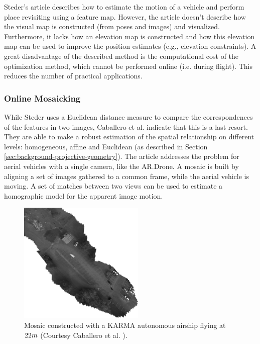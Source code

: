 Steder's article describes how to estimate the motion of a vehicle and perform place revisiting using a feature map.
However, the article doesn't describe how the visual map is constructed (from poses and images) and visualized.
Furthermore, it lacks how an elevation map is constructed and how this elevation map can be used to improve the position estimates (e.g., elevation constraints).
A great disadvantage of the described method is the computational cost of the optimization method, which cannot be performed online (i.e. during flight). This reduces the number of practical applications.


\subsubsection{Online Mosaicking}
\label{related-online-mosaicking}
While Steder uses a Euclidean distance measure to compare the correspondences of the features in two images, Caballero et al. \cite{caballero2009unmanned} indicate that this is a last resort.
They are able to make a robust estimation of the spatial relationship on different levels: homogeneous, affine and Euclidean (as described in Section \ref{sec:background-projective-geometry}).
The article addresses the problem for aerial vehicles with a single camera, like the AR.Drone.
A mosaic is built by aligning a set of images gathered to a common frame, while the aerial vehicle is moving.
A set of matches between two views can be used to estimate a homographic model for the apparent image motion.

\begin{figure}[htb]
\centering
\includegraphics[width=6cm]{images/Caballero_map.png}
\caption{Mosaic constructed with a KARMA autonomous airship flying at $22\small{m}$ (Courtesy Caballero et al. \cite{caballero2009unmanned}).}
\label{fig:Caballero_map}
\end{figure}


